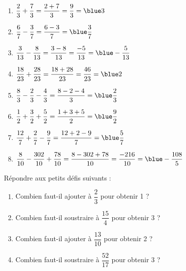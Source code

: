 \begin{colonne*exercice}
\begin{corrige}
   \ \\ [-5mm]
   \begin{enumerate}
      \item $\dfrac23+\dfrac73 =\dfrac{2+7}{3} =\dfrac93 =\blue 3$ \medskip
      \item $\dfrac67-\dfrac37 =\dfrac{6-3}{7} =\blue \dfrac37$ \medskip
      \item $\dfrac3{13}-\dfrac8{13} =\dfrac{3-8}{13} =\dfrac{-5}{13} =\blue -\dfrac{5}{13}$ \medskip
      \item $\dfrac{18}{23}+\dfrac{28}{23} =\dfrac{18+28}{23} =\dfrac{46}{23} =\blue 2$ \medskip
      \item $\dfrac83-\dfrac23-\dfrac43 =\dfrac{8-2-4}{3} =\blue \dfrac23$ \medskip
      \item $\dfrac12+\dfrac32+\dfrac52 =\dfrac{1+3+5}{2} =\blue \dfrac92$ \medskip
      \item $\dfrac{12}7+\dfrac27-\dfrac97 =\dfrac{12+2-9}{7} =\blue \dfrac{5}{7}$ \medskip
      \item $\dfrac8{10}-\dfrac{302}{10}+\dfrac{78}{10} =\dfrac{8-302+78}{10} =\dfrac{-216}{10} =\blue -\dfrac{108}{5}$
   \end{enumerate}
\end{corrige}

\bigskip


\begin{exercice} %
   Répondre aux petits défis suivants :
   \begin{enumerate}
      \item Combien faut-il ajouter à $\dfrac23$ pour obtenir 1 ? \smallskip
      \item Combien faut-il soustraire à $\dfrac{15}4$ pour obtenir 3 ? \smallskip
      \item Combien faut-il ajouter à $\dfrac{13}{10}$ pour obtenir 2 ? \smallskip
      \item Combien faut-il soustraire à $\dfrac{52}{17}$ pour obtenir 3 ?
   \end{enumerate}
\end{exercice}


\end{colonne*exercice}

